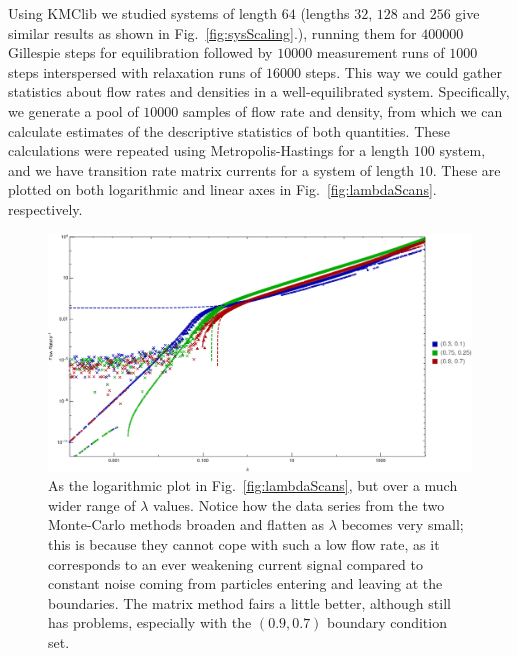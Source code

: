 \documentclass[
reprint, amsmath,amssymb,
]{revtex4-1}
\begin{document}
Using KMClib we studied systems of length $64$ (lengths $32$, $128$ and $256$ give similar
results as shown in Fig.~\ref{fig:sysScaling}.), running them for $400000$ Gillespie steps for equilibration
followed by $10000$ measurement runs of $1000$ steps interspersed with
relaxation runs of $16000$ steps. This way we could gather statistics
about flow rates and densities in a well-equilibrated
system. Specifically, we generate a pool of $10000$ samples of flow
rate and density, from which we can calculate estimates of the
descriptive statistics of both quantities.
These calculations were repeated using Metropolis-Hastings for a length $100$ system, and we have transition rate matrix currents
for a system of length $10$. These are plotted on both logarithmic and linear axes in Fig.~\ref{fig:lambdaScans}.
respectively.

\begin{figure}[h!]
\vspace{0em}
\begin{center}
    \includegraphics[width=1\linewidth]{allDataWide}
\end{center}
\caption{\label{fig:wideScans} As the logarithmic plot in Fig.~\ref{fig:lambdaScans}, but over a much wider range of $\lambda$ values. Notice how the data series from the two Monte-Carlo
methods broaden and flatten as $\lambda$ becomes very small; this is because they cannot cope with such a low flow rate, as it corresponds to an ever weakening current signal compared to constant noise coming
from particles entering and leaving at the boundaries. The matrix method fairs a little better, although still has problems, especially with the $(0.9, 0.7)$ boundary condition set.
}
    \vspace{0em}
\end{figure}
\end{document}
